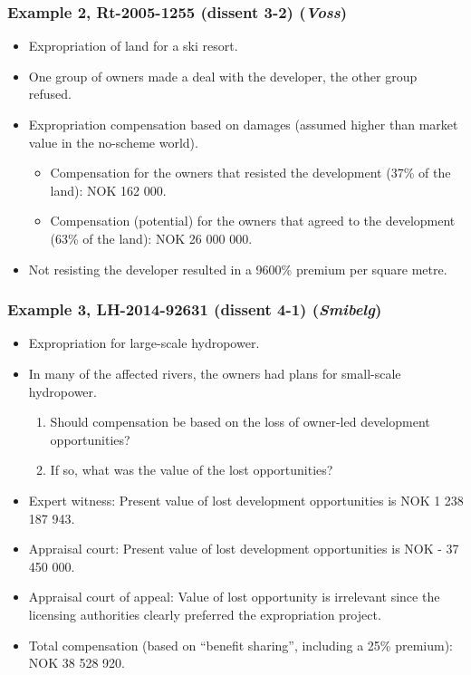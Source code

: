 \documentclass{beamer}
\begin{document}
\begin{frame}\frametitle{Example 2, Rt-2005-1255 (dissent 3-2) ({\it Voss})}
\begin{itemize}
\item Expropriation of land for a ski resort.
\item One group of owners made a deal with the developer, the other group refused.
\item Expropriation compensation based on damages (assumed higher than market value in the no-scheme world).
\begin{itemize}
\item Compensation for the owners that resisted the development (37\% of the land): NOK 162 000.
\item Compensation (potential) for the owners that agreed to the development (63\% of the land): NOK 26 000 000.
\end{itemize}
\item Not resisting the developer resulted in a 9600\% premium per square metre.
\end{itemize}
\end{frame}

\begin{frame}\frametitle{Example 3, LH-2014-92631 (dissent 4-1) ({\it Smibelg})}
\begin{itemize}
\item Expropriation for large-scale hydropower.
\item In many of the affected rivers, the owners had plans for small-scale hydropower.
\begin{enumerate}
\item Should compensation be based on the loss of owner-led development opportunities? 
\item If so, what was the value of the lost opportunities?
\end{enumerate}
\item Expert witness: Present value of lost development opportunities is NOK 1 238 187 943.
\item Appraisal court: Present value of lost development opportunities is NOK - 37 450 000.
\item Appraisal court of appeal: Value of lost opportunity is irrelevant since the licensing authorities 
clearly preferred the expropriation project. 
\item Total compensation (based on ``benefit sharing'', including a 25\% premium): NOK 38 528 920.
\end{itemize}
\end{frame}
\end{document}
